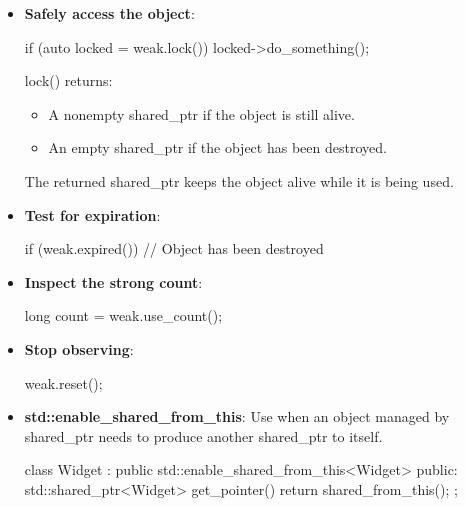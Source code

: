\documentclass{report}
\begin{document}
\begin{itemize}
\begin{itemize}
\begin{cppcode}
                        std::weak_ptr<MyType> weak = shared;
                    \end{cppcode}
                \item \textbf{Safely access the object}:
                    \bigbreak \noindent 
                    \begin{cppcode}
                        if (auto locked = weak.lock()) {
                            locked->do_something();
                        }
                    \end{cppcode}
                    \bigbreak \noindent 
                    lock() returns:
                    \begin{itemize}
                        \item A nonempty shared\_ptr if the object is still alive.
                        \item An empty shared\_ptr if the object has been destroyed.
                    \end{itemize}
                    The returned shared\_ptr keeps the object alive while it is being used.
                \item \textbf{Test for expiration}:
                    \bigbreak \noindent 
                    \begin{cppcode}
                        if (weak.expired()) {
                            // Object has been destroyed
                        }
                    \end{cppcode}
                \item \textbf{Inspect the strong count}:
                    \bigbreak \noindent 
                    \begin{cppcode}
                    long count = weak.use_count();
                    \end{cppcode}
                \item \textbf{Stop observing}:
                    \bigbreak \noindent 
                    \begin{cppcode}
                    weak.reset();
                    \end{cppcode}
                \item \textbf{std::enable\_shared\_from\_this}: Use when an object managed by shared\_ptr needs to produce another shared\_ptr to itself.
                    \bigbreak \noindent 
                    \begin{cppcode}
                        class Widget : public std::enable_shared_from_this<Widget> {
                        public:
                            std::shared_ptr<Widget> get_pointer() {
                                return shared_from_this();
                            }
                        };


\end{cppcode}
\end{itemize}
\end{itemize}
\end{document}
